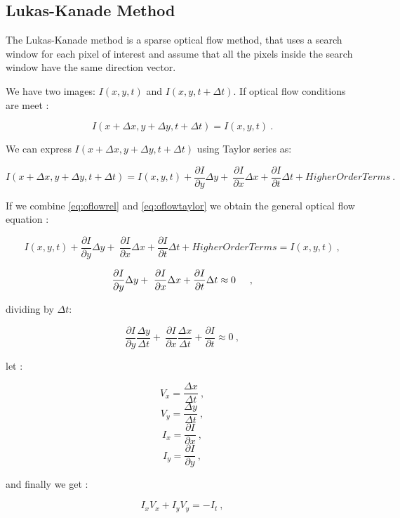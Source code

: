 \subsection{Lukas-Kanade Method}
\label{sec:oflow}

The Lukas-Kanade method is a sparse optical flow method, that 
uses a search window for each pixel of interest and assume that all the pixels 
inside the search window have the same direction vector.


We have two images: $I(x,y,t)$ and $I(x,y,t+\Delta t)$.
If optical flow conditions are meet :

\begin{equation}
\label{eq:oflowrel}
I(x + \Delta x,y + \Delta y, t + \Delta t) = I(x,y,t)\ .
\end{equation}

We can express $I(x + \Delta x, y + \Delta y, t + \Delta t)$ using Taylor series as:

\begin{equation}
\label{eq:oflowtaylor}
I(x + \Delta x, y + \Delta y, t + \Delta t) = I(x,y,t) + \frac{\partial I}{\partial y} \Delta y + \
 \frac{\partial I}{\partial x} \Delta x  + \frac{\partial I}{\partial t} \Delta t + Higher Order Terms \ .
\end{equation}

If we combine \ref{eq:oflowrel} and \ref{eq:oflowtaylor} we obtain the general optical flow equation :


$$ I(x,y,t) + \frac{\partial I}{\partial y} \Delta y + \
 \frac{\partial I}{\partial x} \Delta x  + \frac{\partial I}{\partial t} \Delta t + Higher Order Terms = I(x,y,t)\ , $$


$$ \frac{\partial I}{\partial y} \Delta y + \
 \frac{\partial I}{\partial x} \Delta x  + \frac{\partial I}{\partial t} \Delta t \approx 0 \hspace{0.5cm},  $$

\noindent dividing by $\Delta t$:

$$ \frac{\partial I}{\partial y} \frac{\Delta y}{\Delta t} + \
 \frac{\partial I}{\partial x} \frac{\Delta x}{\Delta t}  + \frac{\partial I}{\partial t}  \approx 0 \ , $$


\noindent let :

$$ V_x = \frac{\Delta x}{\Delta t}\ , $$
$$ V_y = \frac{\Delta y}{\Delta t}\ , $$
$$ I_x = \frac{\partial I}{\partial x}\ ,$$
$$ I_y = \frac{\partial I}{\partial y}\ ,$$

\noindent and finally we get :

$$ I_x V_x + I_y V_y = -I_t \ ,$$

